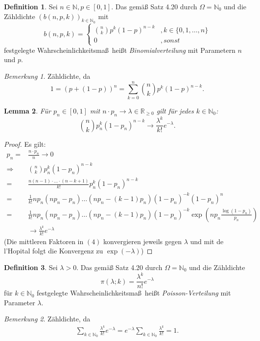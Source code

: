 \documentclass[a4paper,12pt,fleqn]{scrartcl}
\newcommand{\N}{\mathbb{N}}
\newcommand{\R}{\mathbb{R}}
\newcommand{\WM}{Wahrscheinlichkeitsmaß}
\newcommand{\impl}{\Rightarrow}
\theoremstyle{definition}
\newtheorem{definition}{Definition}[section]
\theoremstyle{plain}
\newtheorem{lemma}[definition]{Lemma}
\theoremstyle{remark}
\newtheorem*{bemerkung}{Bemerkung}
\begin{document}
\begin{definition}
Sei $n\in\N,p\in\left[ 0,1\right]$. Das gemäß Satz 4.20 durch $\Omega=\N_0$ und die Zähldichte $(b(n,p,k))_{k\in\N_0}$ mit
\[b(n,p,k)=\begin{cases}
\binom{n}{k}p^k(1-p)^{n-k}&,k\in\{ 0,1,\ldots,n\}\\
0&,sonst
\end{cases}\]
festgelegte \WM \, heißt \emph{Binomialverteilung} mit Parametern $n$ und $p$.
\end{definition}
\begin{bemerkung}
Zähldichte, da
\[1=(p+(1-p))^n=\sum_{k=0}^n\binom{n}{k}p^k(1-p)^{n-k}.\]
\end{bemerkung}
\begin{lemma}
Für $p_n\in\left[ 0,1\right]$ mit $n\cdot p_n\to\lambda\in\R_{\geq 0}$ gilt für jedes $k\in\N_0$:
\[\binom{n}{k}p_n^k(1-p_n)^{n-k}\to\frac{\lambda^k}{k!}e^{-\lambda}.\]
\end{lemma}
\begin{proof}
Es gilt:
\begin{align}
p_n=&\frac{n\cdot p_n}{n}\to 0\\
\impl &\binom{n}{k}p_n^k(1-p_n)^{n-k}\\
=&\frac{n(n-1)\cdot\ldots\cdot(n-k+1)}{k!}p_n^k(1-p_n)^{n-k}\\
=&\frac{1}{k!}np_n(np_n-p_n)\ldots(np_n-(k-1)p_n)(1-p_n)^{-k}(1-p_n)^n\\ 
=&\frac{1}{k!}np_n(np_n-p_n)\ldots(np_n-(k-1)p_n)(1-p_n)^{-k}\exp(np_n\frac{\log(1-p_n)}{p_n})\\ 
&\rightarrow\frac{\lambda^k}{k!}e^{-\lambda}
\end{align}
(Die mittleren Faktoren in $(4)$ konvergieren jeweils gegen $\lambda$ und mit de l'Hopital folgt die Konvergenz zu $\exp(-\lambda)$)
\end{proof}
\begin{definition}
Sei $\lambda>0$. Das gemäß Satz 4.20 durch $\Omega=\N_0$ und die Zähldichte
\[\pi(\lambda;k)=\frac{\lambda^k}{n!}e^{-\lambda}\]
für $k\in\N_0$ festgelegte \WM \, heißt \emph{Poisson-Verteilung} mit Parameter $\lambda$.
\end{definition}
\begin{bemerkung}
Zähldichte, da
\begin{align*}
\sum_{k\in\N_0}\frac{\lambda^k}{k!}e^{-\lambda}=e^{-\lambda}\sum_{k\in\N_0}\frac{\lambda^k}{k!}=1.
\end{align*}
\end{bemerkung}
\end{document}
